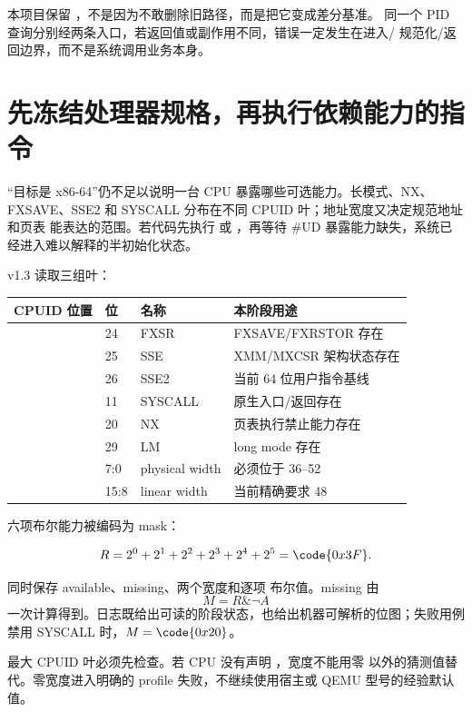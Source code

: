 本项目保留 ，不是因为不敢删除旧路径，而是把它变成差分基准。
同一个 PID 查询分别经两条入口，若返回值或副作用不同，错误一定发生在进入/
规范化/返回边界，而不是系统调用业务本身。

\section{先冻结处理器规格，再执行依赖能力的指令}

“目标是 x86-64”仍不足以说明一台 CPU 暴露哪些可选能力。长模式、NX、
FXSAVE、SSE2 和 SYSCALL 分布在不同 CPUID 叶；地址宽度又决定规范地址和页表
能表达的范围。若代码先执行  或 ，再等待 \#UD
暴露能力缺失，系统已经进入难以解释的半初始化状态。

v1.3 读取三组叶：

\begin{longtable}{L{0.24\textwidth}L{0.16\textwidth}L{0.21\textwidth}L{0.27\textwidth}}
\toprule
CPUID 位置 & 位 & 名称 & 本阶段用途\\
\midrule
{} & 24 & FXSR & FXSAVE/FXRSTOR 存在\\
 & 25 & SSE & XMM/MXCSR 架构状态存在\\
 & 26 & SSE2 & 当前 64 位用户指令基线\\
 & 11 & SYSCALL & 原生入口/返回存在\\
 & 20 & NX & 页表执行禁止能力存在\\
 & 29 & LM & long mode 存在\\
 & 7:0 & physical width & 必须位于 36--52\\
 & 15:8 & linear width & 当前精确要求 48\\
\bottomrule
\end{longtable}

六项布尔能力被编码为  mask：

\[
  R = 2^0+2^1+2^2+2^3+2^4+2^5 = \code{0x3F}.
\]

 同时保存 available、missing、两个宽度和逐项
布尔值。missing 由
\[
  M = R \mathbin{\&} \neg A
\]
一次计算得到。日志既给出可读的阶段状态，也给出机器可解析的位图；失败用例
禁用 SYSCALL 时，\(M=\code{0x20}\)。

\begin{contractbox}
最大 CPUID 叶必须先检查。若 CPU 没有声明 ，宽度不能用零
以外的猜测值替代。零宽度进入明确的 profile 失败，不继续使用宿主或 QEMU
型号的经验默认值。
\end{contractbox}

